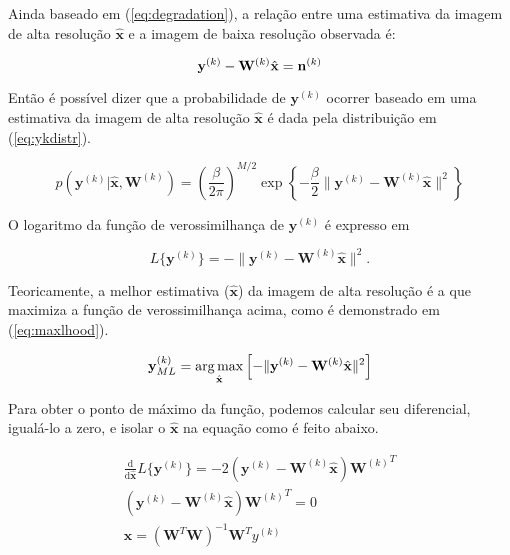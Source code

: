 Ainda baseado em (\ref{eq:degradation}), a relação entre uma estimativa da imagem de alta resolução $\hat{\mathbf{x}}$ e a imagem de baixa resolução observada é:

\begin{equation}
	\mathbf{y}^{(k)} - \mathbf{W}^{(k)}\hat{\mathbf{x}} =  \mathbf{n}^{(k)} \\
\end{equation}

Então é possível dizer que a probabilidade de $\mathbf{y}^{(k)}$ ocorrer baseado em uma estimativa da imagem de alta resolução $\hat{\mathbf{x}}$ é dada pela distribuição em (\ref{eq:ykdistr}).

\begin{equation}
	\label{eq:ykdistr}
	p(\mathbf{y}^{(k)} | \hat{\mathbf{x}}, \mathbf{W}^{(k)}) = \left(\frac{ \beta}{2\pi} \right)^{M/2}
	\exp{\left\{-\frac{\beta}{2}\|\mathbf{y}^{(k)} - \mathbf{W}^{(k)}\hat{\mathbf{x}}\|^2 \right\}}
\end{equation}

O logaritmo da função de verossimilhança de $\mathbf{y}^{(k)}$ é expresso em

\begin{equation}
	L\{\mathbf{y}^{(k)}\} = -\|\mathbf{y}^{(k)} - \mathbf{W}^{(k)}\hat{\mathbf{x}}\|^2.
\end{equation}

Teoricamente, a melhor estimativa ($\hat{\mathbf{x}}$) da imagem de alta resolução é a
que maximiza a função de verossimilhança acima, como é demonstrado em (\ref{eq:maxlhood}).

\begin{equation}
	\label{eq:maxlhood}
	\mathbf{y}^{(k)}_{ML} = \operatorname*{arg\,max}_{\hat{\mathbf{x}}}
	\left[-\|\mathbf{y}^{(k)} - \mathbf{W}^{(k)}\hat{\mathbf{x}}\|^2 
	\right ]
\end{equation}

Para obter o ponto de máximo da função, podemos calcular seu diferencial, igualá-lo a zero, e isolar o $\hat{\mathbf{x}}$ na equação como é feito abaixo.

\begin{gather}
	\frac{\mathrm{d}}{\mathrm{d} \hat{\mathbf{x}}}
	L\{\mathbf{y}^{(k)}\} = -2 (\mathbf{y}^{(k)} - \mathbf{W}^{(k)}\hat{\mathbf{x}}) {\mathbf{W}^{(k)}}^T \\
	(\mathbf{y}^{(k)} - \mathbf{W}^{(k)}\hat{\mathbf{x}}) {\mathbf{W}^{(k)}}^T = 0 \\
	\hat{\mathbf{x}} = (\mathbf{W}^T\mathbf{W})^{-1} \mathbf{W}^T y^{(k)}
\end{gather}

